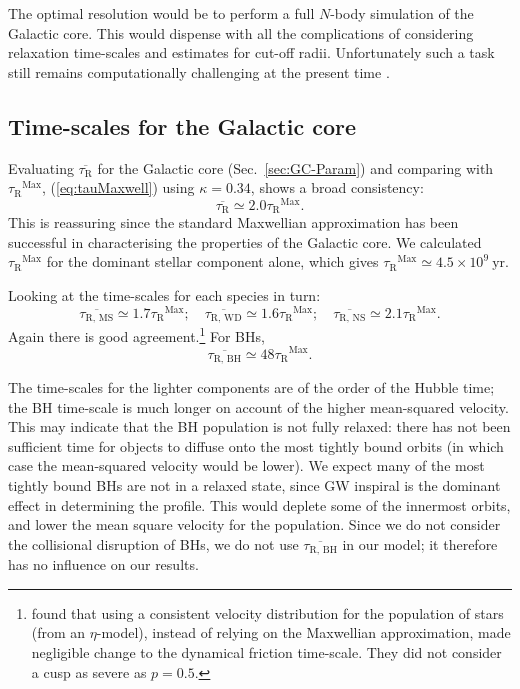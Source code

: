 \documentclass[useAMS,usedcolumn,usegraphicx,usenatbib]{mn2e}
\newcommand{\eqnref}[1]{(\ref{eq:#1})}
\newcommand{\secref}[1]{Sec.~\ref{sec:#1}}
\newcommand{\units}[1]{\ensuremath{~\mathrm{#1}}}
\newcommand{\sub}[1]{\ensuremath{_\mathrm{#1}}}
\newcommand{\super}[1]{\ensuremath{^\mathrm{#1}}}
\begin{document}
\begin{onecolumn}
The optimal resolution would be to perform a full $N$-body simulation of the Galactic core. This would dispense with all the complications of considering relaxation time-scales and estimates for cut-off radii. Unfortunately such a task still remains computationally challenging at the present time \citep[e.g.,][]{Li2012}.

\subsection{Time-scales for the Galactic core}\label{sec:tauGC}

Evaluating $\overline{\tau\sub{R}}$ for the Galactic core (\secref{GC-Param}) and comparing with $\tau\sub{R}\super{Max}$, \eqnref{tauMaxwell} using $\kappa = 0.34$, shows a broad consistency:
\begin{equation}
\overline{\tau\sub{R}} \simeq 2.0 \tau\sub{R}\super{Max}.
\end{equation}
This is reassuring since the standard Maxwellian approximation has been successful in characterising the properties of the Galactic core. We calculated $\tau\sub{R}\super{Max}$ for the dominant stellar component alone, which gives $\tau\sub{R}\super{Max}\simeq 4.5 \times 10^9\units{yr}$.

Looking at the time-scales for each species in turn:
\begin{equation}
\overline{\tau\sub{R,\,MS}} \simeq 1.7 \tau\sub{R}\super{Max};\quad \overline{\tau\sub{R,\,WD}} \simeq 1.6 \tau\sub{R}\super{Max};\quad \overline{\tau\sub{R,\,NS}} \simeq 2.1 \tau\sub{R}\super{Max}.
\end{equation}
Again there is good agreement.\footnote{\citet*{Freitag2006} found that using a consistent velocity distribution for the population of stars (from an $\eta$-model), instead of relying on the Maxwellian approximation, made negligible change to the dynamical friction time-scale. They did not consider a cusp as severe as $p = 0.5$.} For BHs,
\begin{equation}
\overline{\tau\sub{R,\,BH}} \simeq 48 \tau\sub{R}\super{Max}.
\end{equation}

The time-scales for the lighter components are of the order of the Hubble time; the BH time-scale is much longer on account of the higher mean-squared velocity. This may indicate that the BH population is not fully relaxed: there has not been sufficient time for objects to diffuse onto the most tightly bound orbits (in which case the mean-squared velocity would be lower). We expect many of the most tightly bound BHs are not in a relaxed state, since GW inspiral is the dominant effect in determining the profile. This would deplete some of the innermost orbits, and lower the mean square velocity for the population. Since we do not consider the collisional disruption of BHs, we do not use $\overline{\tau\sub{R,\,BH}}$ in our model; it therefore has no influence on our results.


\end{onecolumn}
\end{document}
